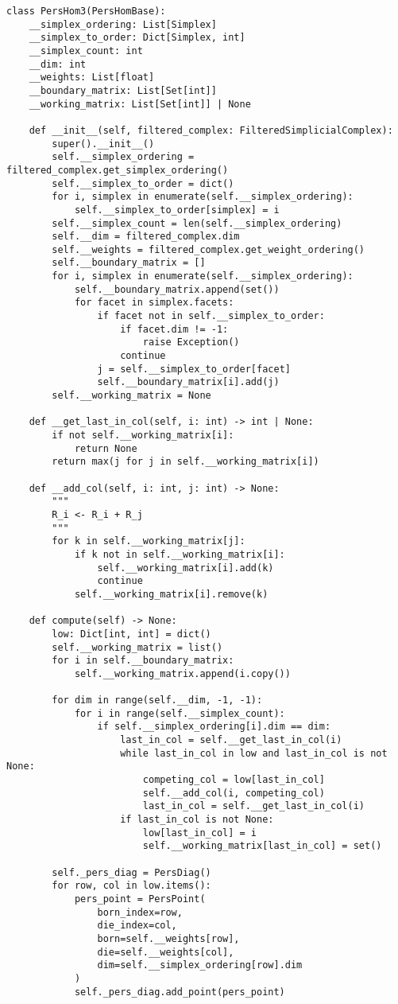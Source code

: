 \begin{verbatim}
class PersHom3(PersHomBase):
    __simplex_ordering: List[Simplex]
    __simplex_to_order: Dict[Simplex, int]
    __simplex_count: int
    __dim: int
    __weights: List[float]
    __boundary_matrix: List[Set[int]]
    __working_matrix: List[Set[int]] | None

    def __init__(self, filtered_complex: FilteredSimplicialComplex):
        super().__init__()
        self.__simplex_ordering = filtered_complex.get_simplex_ordering()
        self.__simplex_to_order = dict()
        for i, simplex in enumerate(self.__simplex_ordering):
            self.__simplex_to_order[simplex] = i
        self.__simplex_count = len(self.__simplex_ordering)
        self.__dim = filtered_complex.dim
        self.__weights = filtered_complex.get_weight_ordering()
        self.__boundary_matrix = []
        for i, simplex in enumerate(self.__simplex_ordering):
            self.__boundary_matrix.append(set())
            for facet in simplex.facets:
                if facet not in self.__simplex_to_order:
                    if facet.dim != -1:
                        raise Exception()
                    continue
                j = self.__simplex_to_order[facet]
                self.__boundary_matrix[i].add(j)
        self.__working_matrix = None

    def __get_last_in_col(self, i: int) -> int | None:
        if not self.__working_matrix[i]:
            return None
        return max(j for j in self.__working_matrix[i])

    def __add_col(self, i: int, j: int) -> None:
        """
        R_i <- R_i + R_j
        """
        for k in self.__working_matrix[j]:
            if k not in self.__working_matrix[i]:
                self.__working_matrix[i].add(k)
                continue
            self.__working_matrix[i].remove(k)

    def compute(self) -> None:
        low: Dict[int, int] = dict()
        self.__working_matrix = list()
        for i in self.__boundary_matrix:
            self.__working_matrix.append(i.copy())

        for dim in range(self.__dim, -1, -1):
            for i in range(self.__simplex_count):
                if self.__simplex_ordering[i].dim == dim:
                    last_in_col = self.__get_last_in_col(i)
                    while last_in_col in low and last_in_col is not None:
                        competing_col = low[last_in_col]
                        self.__add_col(i, competing_col)
                        last_in_col = self.__get_last_in_col(i)
                    if last_in_col is not None:
                        low[last_in_col] = i
                        self.__working_matrix[last_in_col] = set()

        self._pers_diag = PersDiag()
        for row, col in low.items():
            pers_point = PersPoint(
                born_index=row,
                die_index=col,
                born=self.__weights[row],
                die=self.__weights[col],
                dim=self.__simplex_ordering[row].dim
            )
            self._pers_diag.add_point(pers_point)
\end{verbatim}


